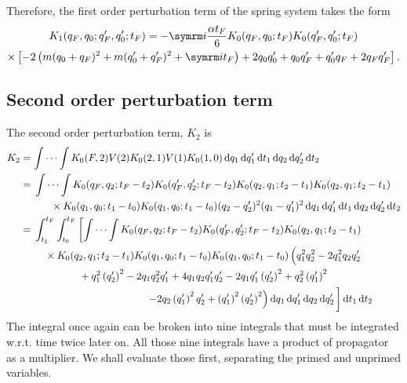 Therefore, the first order perturbation term of the spring system takes the form
\begin{multline}
    K_1(q_F, q_0; q_F', q_0'; t_F) = -\im\frac{\alpha t_F}{6}K_0(q_F, q_0; t_F)K_0(q_F', q_0'; t_F) \\
    \times\left[-2\left(m(q_0 + q_F)^2 + m(q_0' + q_F')^2 + \im t_F\right) + 2q_0q_0' + q_0q_F' + q_0'q_F + 2q_Fq_F'\right].
\end{multline}

\subsection{Second order perturbation term}

The second order perturbation term, $K_2$ is
\begin{align}
    K_2 &= \idotsint K_0(F, 2)V(2)K_0(2, 1)V(1)K_0(1, 0)\dd{q_1}\dd{q_1'}\dd{t_1}\dd{q_2}\dd{q_2'}\dd{t_2} \\
    &= \begin{multlined}[t]
        \idotsint K_0(q_F, q_2; t_F - t_2)K_0(q_F', q_2'; t_F - t_2)K_0(q_2, q_1; t_2 - t_1)K_0(q_2, q_1; t_2 - t_1) \\ \times K_0(q_1, q_0; t_1 - t_0)K_0(q_1, q_0; t_1 - t_0)(q_2 - q_2')^2(q_1 - q_1')^2\dd{q_1}\dd{q_1'}\dd{t_1}\dd{q_2}\dd{q_2'}\dd{t_2}
    \end{multlined} \\
    &= \begin{multlined}[t]
        \int_{t_1}^{t_F}\int_{t_0}^{t_F}\left[\idotsint K_0(q_F, q_2; t_F - t_2)K_0(q_F', q_2'; t_F - t_2)K_0(q_2, q_1; t_2 - t_1)\right. \\ \times K_0(q_2, q_1; t_2 - t_1)K_0(q_1, q_0; t_1 - t_0)K_0(q_1, q_0; t_1 - t_0) \left(\vphantom{\left(q_{2}^{\prime}\right)^{2}} q_{1}^{2} q_{2}^{2} - 2 q_{1}^{2} q_{2} q_{2}^{\prime} \right.\\ + q_{1}^{2} \left(q_{2}^{\prime}\right)^{2} - 2 q_{1} q_{2}^{2} q_{1}^{\prime} + 4 q_{1} q_{2} q_{1}^{\prime} q_{2}^{\prime} - 2 q_{1} q_{1}^{\prime} \left(q_{2}^{\prime}\right)^{2} + q_{2}^{2} \left(q_{1}^{\prime}\right)^{2} \\ \left.\left. - 2 q_{2} \left(q_{1}^{\prime}\right)^{2} q_{2}^{\prime} + \left(q_{1}^{\prime}\right)^{2} \left(q_{2}^{\prime}\right)^{2} \right) \dd{q_1}\dd{q_1'}\dd{q_2}\dd{q_2'} \vphantom{\idotsint}\right]\dd{t_1}\dd{t_2}
    \end{multlined}
\end{align}
The integral once again can be broken into nine integrals that must be integrated w.r.t. time twice later on. All those nine integrals have a product of propagator as a multiplier. We shall evaluate those first, separating the primed and unprimed variables.
